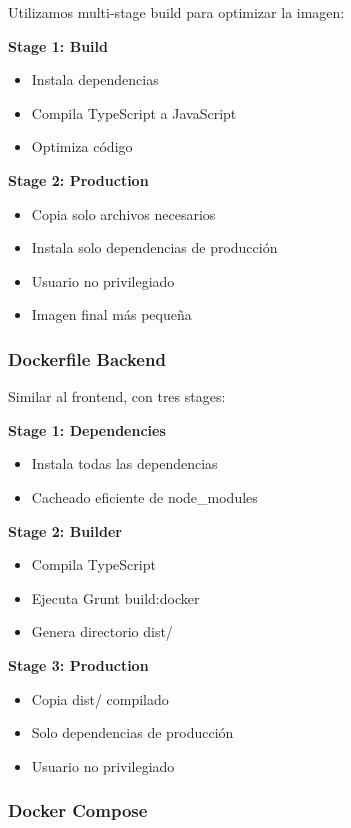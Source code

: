 \documentclass[12pt,a4paper]{article}
\begin{document}
Utilizamos multi-stage build para optimizar la imagen:

\textbf{Stage 1: Build}
\begin{itemize}
    \item Instala dependencias
    \item Compila TypeScript a JavaScript
    \item Optimiza código
\end{itemize}

\textbf{Stage 2: Production}
\begin{itemize}
    \item Copia solo archivos necesarios
    \item Instala solo dependencias de producción
    \item Usuario no privilegiado
    \item Imagen final más pequeña
\end{itemize}

\subsubsection{Dockerfile Backend}

Similar al frontend, con tres stages:

\textbf{Stage 1: Dependencies}
\begin{itemize}
    \item Instala todas las dependencias
    \item Cacheado eficiente de node\_modules
\end{itemize}

\textbf{Stage 2: Builder}
\begin{itemize}
    \item Compila TypeScript
    \item Ejecuta Grunt build:docker
    \item Genera directorio dist/
\end{itemize}

\textbf{Stage 3: Production}
\begin{itemize}
    \item Copia dist/ compilado
    \item Solo dependencias de producción
    \item Usuario no privilegiado
\end{itemize}

\subsubsection{Docker Compose}
\end{document}

